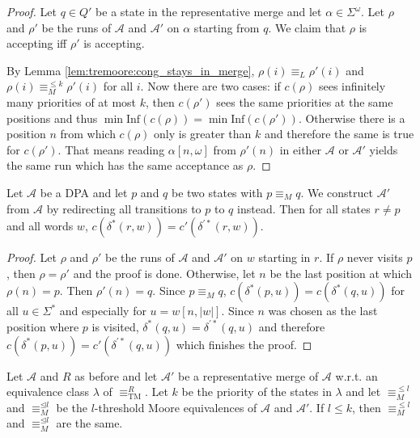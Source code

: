 \begin{proof}
	Let $q \in Q'$ be a state in the representative merge and let $\alpha \in \Sigma^\omega$. Let $\rho$ and $\rho'$ be the runs of $\mathcal{A}$ and $\mathcal{A}'$ on $\alpha$ starting from $q$. We claim that $\rho$ is accepting iff $\rho'$ is accepting.
	
	By Lemma \ref{lem:tremoore:cong_stays_in_merge}, $\rho(i) \equiv_L \rho'(i)$ and $\rho(i) \equiv_M^{\leq k} \rho'(i)$ for all $i$. Now there are two cases: if $c(\rho)$ sees infinitely many priorities of at most $k$, then $c(\rho')$ sees the same priorities at the same positions and thus $\min \text{Inf}(c(\rho)) = \min \text{Inf}(c(\rho'))$. Otherwise there is a position $n$ from which $c(\rho)$ only is greater than $k$ and therefore the same is true for $c(\rho')$. That means reading $\alpha[n,\omega]$ from $\rho'(n)$ in either $\mathcal{A}$ or $\mathcal{A}'$ yields the same run which has the same acceptance as $\rho$.
\end{proof}

\begin{lem}
	Let $\mathcal{A}$ be a DPA and let $p$ and $q$ be two states with $p \equiv_M q$. We construct $\mathcal{A}'$ from $\mathcal{A}$ by redirecting all transitions to $p$ to $q$ instead. Then for all states $r \neq p$ and all words $w$, $c(\delta^*(r, w)) = c'(\delta^{\prime *}(r, w))$.
	\label{lem:tremoore:moore_redirect_is_ok}
\end{lem}

\begin{proof}
	Let $\rho$ and $\rho'$ be the runs of $\mathcal{A}$ and $\mathcal{A}'$ on $w$ starting in $r$. If $\rho$ never visits $p$, then $\rho = \rho'$ and the proof is done. Otherwise, let $n$ be the last position at which $\rho(n) = p$. Then $\rho'(n) = q$. Since $p \equiv_M q$, $c(\delta^*(p, u)) = c(\delta^*(q, u))$ for all $u \in \Sigma^*$ and especially for $u = w[n, |w|]$. Since $n$ was chosen as the last position where $p$ is visited, $\delta^*(q, u) = \delta^{\prime *}(q, u)$ and therefore $c(\delta^*(p, u)) = c'(\delta^{\prime *}(q, u))$ which finishes the proof.
\end{proof}

\begin{lem}
	Let $\mathcal{A}$ and $R$ as before and let $\mathcal{A}'$ be a representative merge of $\mathcal{A}$ w.r.t. an equivalence class $\lambda$ of $\equiv_\text{TM}^R$. Let $k$ be the priority of the states in $\lambda$ and let $\equiv_M^{\leq l}$ and $\equiv_M^{\unlhd l}$ be the $l$-threshold Moore equivalences of $\mathcal{A}$ and $\mathcal{A}'$. If $l \leq k$, then $\equiv_M^{\leq l}$ and $\equiv_M^{\unlhd l}$ are the same.
\end{lem}

